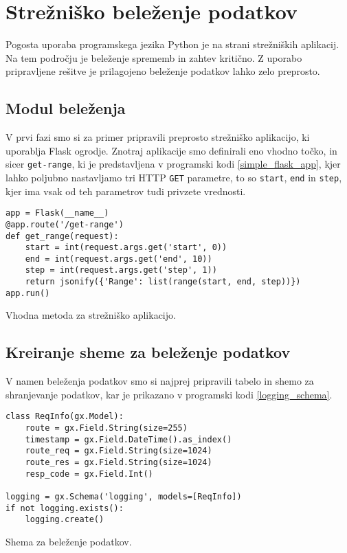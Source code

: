 \documentclass[a4paper,12pt,openright]{book}
\begin{document}
    \section{Strežniško beleženje podatkov}

    Pogosta uporaba programskega jezika Python je na strani strežniških aplikacij. Na tem področju je beleženje sprememb in zahtev kritično. Z uporabo pripravljene rešitve je prilagojeno beleženje podatkov lahko zelo preprosto.

    \subsection{Modul beleženja}

    V prvi fazi smo si za primer pripravili preprosto strežniško aplikacijo, ki uporablja Flask \cite{FLASK_GITHUB} ogrodje. Znotraj aplikacije smo definirali eno vhodno točko, in sicer {\tt get-range}, ki je predstavljena v programski kodi \ref{simple_flask_app}, kjer lahko poljubno nastavljamo tri HTTP {\tt GET} parametre, to so {\tt start}, {\tt end} in {\tt step}, kjer ima vsak od teh parametrov tudi privzete vrednosti.

\begin{code}
\begin{verbatim}
app = Flask(__name__)
@app.route('/get-range')
def get_range(request):
    start = int(request.args.get('start', 0))
    end = int(request.args.get('end', 10))
    step = int(request.args.get('step', 1))
    return jsonify({'Range': list(range(start, end, step))})
app.run()
\end{verbatim}
\caption{Vhodna metoda za strežniško aplikacijo.}
\label{simple_flask_app}
\end{code}

    \subsection{Kreiranje sheme za beleženje podatkov}

    V namen beleženja podatkov smo si najprej pripravili tabelo in shemo za shranjevanje podatkov, kar je prikazano v programski kodi \ref{logging_schema}.

\begin{code}
\begin{verbatim}
class ReqInfo(gx.Model):
    route = gx.Field.String(size=255)
    timestamp = gx.Field.DateTime().as_index()
    route_req = gx.Field.String(size=1024)
    route_res = gx.Field.String(size=1024)
    resp_code = gx.Field.Int()

logging = gx.Schema('logging', models=[ReqInfo])
if not logging.exists():
    logging.create()
\end{verbatim}
\caption{Shema za beleženje podatkov.}
\label{logging_schema}
\end{code}
\end{document}
